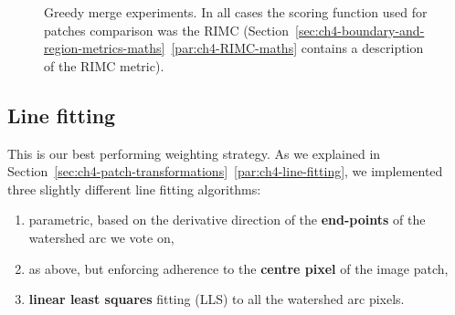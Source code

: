 \begin{figure}[t]
\centering
\caption[Greedy merge experiments - plots]{Greedy merge experiments. In all cases the scoring function used for patches comparison was the RIMC (Section~\ref*{sec:ch4-boundary-and-region-metrics-maths}~\ref{par:ch4-RIMC-maths} contains a description of the RIMC metric).} %
\label{fig:segs-to-greedy-merge-RIMC}
\end{figure}

\subsection{Line fitting}
This is our best performing weighting strategy. As we explained in Section~\ref*{sec:ch4-patch-transformations}~\ref{par:ch4-line-fitting}, we implemented three slightly different line fitting algorithms:
\begin{enumerate}
  \item parametric, based on the derivative direction of the {\bf end-points} of the watershed arc we vote on,
  \item as above, but enforcing adherence to the {\bf centre pixel} of the image patch,
  \item {\bf linear least squares} fitting (LLS) to all the watershed arc pixels.
\end{enumerate}

